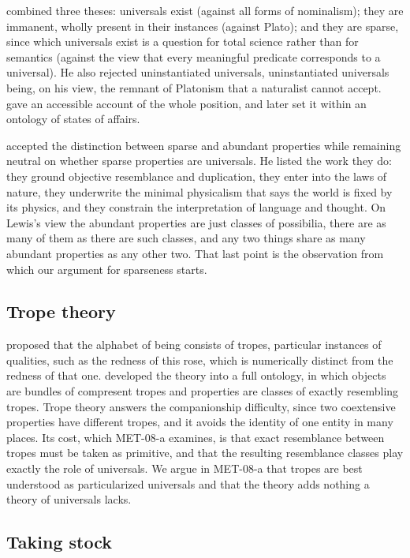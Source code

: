 \documentclass{situationist-preprint}
\begin{document}
\citet{Armstrong1978} combined three theses: universals exist (against all forms of nominalism); they are immanent, wholly present in their instances (against Plato); and they are sparse, since which universals exist is a question for total science rather than for semantics (against the view that every meaningful predicate corresponds to a universal). He also rejected uninstantiated universals, uninstantiated universals being, on his view, the remnant of Platonism that a naturalist cannot accept. \citet{Armstrong1989} gave an accessible account of the whole position, and later \citep{Armstrong1997} set it within an ontology of states of affairs.

\citet{Lewis1983} accepted the distinction between sparse and abundant properties while remaining neutral on whether sparse properties are universals. He listed the work they do: they ground objective resemblance and duplication, they enter into the laws of nature, they underwrite the minimal physicalism that says the world is fixed by its physics, and they constrain the interpretation of language and thought. On Lewis's view the abundant properties are just classes of possibilia, there are as many of them as there are such classes, and any two things share as many abundant properties as any other two. That last point is the observation from which our argument for sparseness starts.

\subsection{Trope theory}

\citet{Williams1953} proposed that the alphabet of being consists of tropes, particular instances of qualities, such as the redness of this rose, which is numerically distinct from the redness of that one. \citet{Campbell1990} developed the theory into a full ontology, in which objects are bundles of compresent tropes and properties are classes of exactly resembling tropes. Trope theory answers the companionship difficulty, since two coextensive properties have different tropes, and it avoids the identity of one entity in many places. Its cost, which MET-08-a examines, is that exact resemblance between tropes must be taken as primitive, and that the resulting resemblance classes play exactly the role of universals. We argue in MET-08-a that tropes are best understood as particularized universals and that the theory adds nothing a theory of universals lacks.

\subsection{Taking stock}
\end{document}
